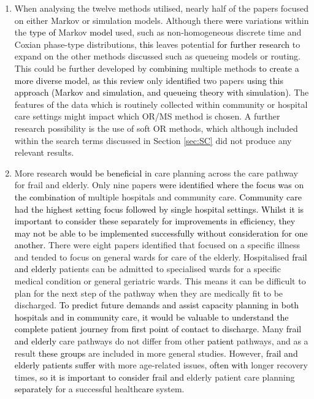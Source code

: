 \documentclass[../thesis.tex]{subfiles}
\begin{document}
\begin{enumerate}%
    \item When analysing the twelve methods utilised, nearly half of the papers focused on either Markov or simulation models. Although there \textcolor{black}{were} variation\textcolor{black}{s} within the \textcolor{black}{type of} Markov \textcolor{black}{model} used, such as non-homogeneous discrete time and Coxian phase-type distributions, \textcolor{black}{this} leaves potential \textcolor{black}{for further research }to expand on the other methods discussed such as queueing models or routing. This could be further developed by \textcolor{black}{combining} multiple methods \textcolor{black}{to create a more diverse model}, \textcolor{black}{as this review} only \textcolor{black}{identified} two papers \textcolor{black}{using this approach (Markov and simulation, and queueing theory with simulation).} The features of the data which is routinely collected within community or hospital care settings might impact which OR/MS method is chosen. A further research possibility is the use of soft OR methods, which although included within the search terms discussed in Section \ref{sec:SC} did not produce any relevant results.
    
    
\item More research \textcolor{black}{would be beneficial} in care planning across the care pathway for frail and elderly. Only nine papers \textcolor{black}{were identified where the focus was} on \textcolor{black}{the combination of} multiple hospitals and community care.
\textcolor{black}{Community care had the highest setting focus followed by single hospital settings. Whilst it is important to consider these separately for improvements in efficiency, they may not be able to be implemented successfully without consideration for one another.}
There were eight papers identified that focused on a specific illness and tended to focus on general wards for care of the elderly. Hospitalised \textcolor{black}{frail and elderly} patients can be admitted to specialised wards for a specific medical condition or general geriatric wards. This means it can be difficult to plan for the next step of the pathway when they are medically fit to be discharged. \textcolor{black}{To predict future demands and assist capacity planning in both hospitals and in community care, it would be valuable to understand the complete patient journey from first point of contact to discharge}. Many \textcolor{black}{frail and elderly} care pathways do not differ from other \textcolor{black}{patient} pathways, and as a result \textcolor{black}{these groups} are included in more general studies. However, \textcolor{black}{frail and elderly patients suffer} with more age-related issues, \textcolor{black}{often with} longer recovery times\textcolor{black}{, so it is important to consider frail and} elderly patient care planning \textcolor{black}{separately} for a successful health\textcolor{black}{care} system.


\end{enumerate}
\end{document}
